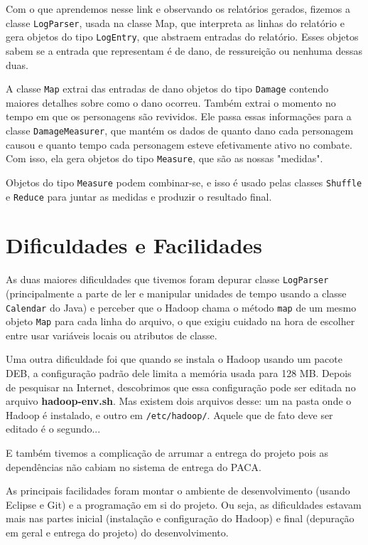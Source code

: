 \documentclass[a4paper,11pt]{article}
\begin{document}
  Com o que aprendemos nesse link e observando os relatórios gerados, fizemos a
  classe \verb$LogParser$, usada na classe Map, que interpreta as linhas do
  relatório e gera objetos do tipo \verb$LogEntry$, que abstraem entradas do
  relatório. Esses objetos sabem se a entrada que representam é de dano, de
  ressureição ou nenhuma dessas duas.
  
  A classe \verb$Map$ extrai das entradas de dano objetos do tipo \verb$Damage$
  contendo maiores detalhes sobre como o dano ocorreu. Também extrai o momento
  no tempo em que os personagens são revividos. Ele passa essas informações para
  a classe \verb$DamageMeasurer$, que mantém os dados de quanto dano cada
  personagem causou e quanto tempo cada personagem esteve efetivamente ativo no
  combate. Com isso, ela gera objetos do tipo \verb$Measure$, que são as nossas
  "medidas".
  
  Objetos do tipo \verb$Measure$ podem combinar-se, e isso é usado pelas classes
  \verb$Shuffle$ e \verb$Reduce$ para juntar as medidas e produzir o resultado
  final.
  
\section{Dificuldades e Facilidades}

  As duas maiores dificuldades que tivemos foram depurar classe \verb$LogParser$
  (principalmente a parte de ler e manipular unidades de tempo usando a classe
  \verb$Calendar$ do Java) e perceber que o Hadoop chama o método \verb$map$ de
  um mesmo objeto \verb$Map$ para cada linha do arquivo, o que exigiu cuidado na
  hora de escolher entre usar variáveis locais ou atributos de classe.
  
  Uma outra dificuldade foi que quando se instala o Hadoop usando um pacote DEB,
  a configuração padrão dele limita a memória usada para 128 MB. Depois de
  pesquisar na Internet, descobrimos que essa configuração pode ser editada no
  arquivo \textbf{hadoop-env.sh}. Mas existem dois arquivos desse: um na pasta
  onde o Hadoop é instalado, e outro em \verb$/etc/hadoop/$. Aquele que de fato
  deve ser editado é o segundo...
  
  E também tivemos a complicação de arrumar a entrega do projeto pois as
  dependências não cabiam no sistema de entrega do PACA.
  
  As principais facilidades foram montar o ambiente de desenvolvimento (usando
  Eclipse e Git) e a programação em si do projeto. Ou seja, as dificuldades
  estavam mais nas partes inicial (instalação e configuração do Hadoop) e final
  (depuração em geral e entrega do projeto) do desenvolvimento.
\end{document}
